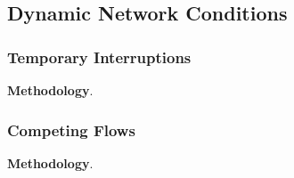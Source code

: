 \subsection{Dynamic Network Conditions}

\subsubsection{Temporary Interruptions}

\noindent \textbf{Methodology}.

\subsubsection{Competing Flows}

\noindent \textbf{Methodology}.



